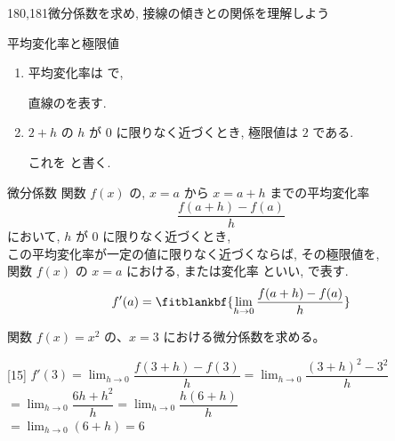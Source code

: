 \documentclass[14pt,dvipdfmx]{jsarticle}
\begin{document}
  {180,181}{微分係数を求め, 接線の傾きとの関係を理解しよう}

\setcounter{definition}{2}

\vspace{-2.0zw}%
\vspace{-0.35em}
\begin{reviewbox}{平均変化率と極限値}
  \begin{enumerate}[label=\textbf{\arabic*}, leftmargin=1.5zw, itemsep=0.2em]
    \item 平均変化率は {\renewcommand{\fitblankpad}{6zw}%
          } で,
          \par\vspace{0.5em}
          直線のを表す.
    \item $2 + h$ の $h$ が $0$ に限りなく近づくとき, 極限値は $2$ である.
          \par\vspace{0.5em}
          これを {\renewcommand{\fitblankpad}{5zw}%
          } と書く.
  \end{enumerate}
\end{reviewbox}

\vspace{0.5em}
\vspace{-0.3em}
\begin{definitionbox}{微分係数}
  関数 $f(x)$ の, $x=a$ から $x=a+h$ までの平均変化率
  \[
    \frac{f(a+h)-f(a)}{h}
  \]
  において, $h$ が $0$ に限りなく近づくとき,\\
  この平均変化率が一定の値に限りなく近づくならば, その極限値を,\\
  関数 $f(x)$ の $x=a$ における, または変化率
  といい,  で表す.
  \[
    f'(a)=\fitblankbf{\lim_{h \to 0}\frac{f(a+h)-f(a)}{h}}
  \]
\end{definitionbox}

\vfill
\nextpage

\vspace{-1.4zw}%
\quad
関数 $f(x)=x^{2}$ の、$x=3$ における微分係数を求める。

\vspace{0.15em}
\begin{answerbox}{}[15]
  $f'(3)=\lim_{h \to 0}\dfrac{f(3+h)-f(3)}{h}
    =\lim_{h \to 0}\dfrac{(3+h)^{2}-3^{2}}{h}$\\[0.55em]
  $=\lim_{h \to 0}\dfrac{6h+h^{2}}{h}
    =\lim_{h \to 0}\dfrac{h(6+h)}{h}$\\[0.55em]
  $=\lim_{h \to 0}(6+h)=6$
\end{answerbox}
\end{document}
